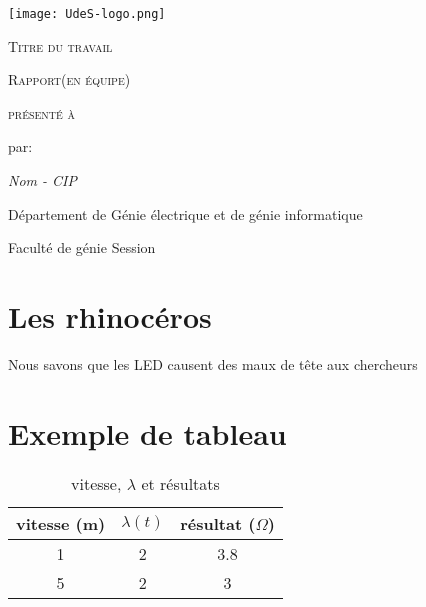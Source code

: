 \documentclass[letter,11pt]{report}
\begin{document}
\begin{titlepage}
	\setlength{\parskip}{0em}
	\centering \texttt{[image: UdeS-logo.png]}\par\vspace{1cm}
	\vspace{0.5cm}
	
	\vspace{2cm}
	{\scshape\LARGE\centering Titre du travail \par}
	{\scshape\large\centering Rapport(en équipe) \par}
	\vspace{2cm}
	{\centering\scshape présenté à \par}
	\vspace{2cm}
	{\centering par: \par}
	{\itshape\centering Nom - CIP \par}	
	\vspace{3cm}
	{\centering Département de Génie électrique et de génie informatique\par}
    {\centering Faculté de génie}
	\vfill
	{\centering Session}

\end{titlepage}

\setcounter{page}{1}

\renewcommand{\contentsname}{Sommaire}
\tableofcontents
\setlength{\parskip}{1em}

\newpage

\setcounter{page}{1}

\section{Les rhinocéros}
Nous savons que les LED causent des maux de tête aux chercheurs \cite{FuturaDEL2}

\section{Exemple de tableau}

\begin{table}
  \begin{center}
    \caption{vitesse, $\lambda$ et résultats}
    \begin{tabular}{ccc}
      \hline
      \bf vitesse (m) & \bf $\lambda (t)$ & \bf résultat ($\Omega$) \\
      \hline
      \hline
      1 & 2 & 3.8 \\
      5 & 2 & 3 \\
      \hline
    \end{tabular}
  \end{center}
\end{table}



\end{document}
